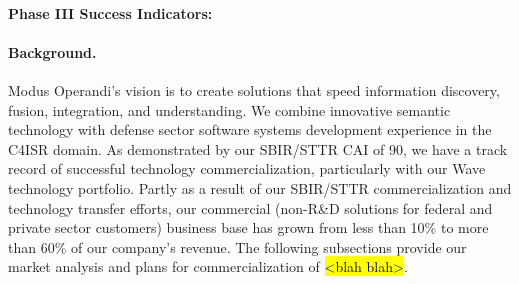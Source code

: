 \documentclass{sbir}
\begin{document}
\paragraph{Phase III Success Indicators:} 
\begin{center}
\vspace{-12pt}
\end{center}

\paragraph{Background.} Modus Operandi's vision is to create solutions that speed information discovery, fusion, integration, and understanding. We combine innovative semantic technology with defense sector software systems development experience in the C4ISR domain. As demonstrated by our SBIR/STTR CAI of 90, we have a track record of successful technology commercialization, particularly with our Wave technology portfolio. Partly as a result of our SBIR/STTR commercialization and technology transfer efforts, our commercial (non-R\&D solutions for federal and private sector customers) business base has grown from less than 10\% to more than 60\% of our company's revenue. The following subsections provide our market analysis and plans for commercialization of \hl{<blah blah>}.
\end{document}
